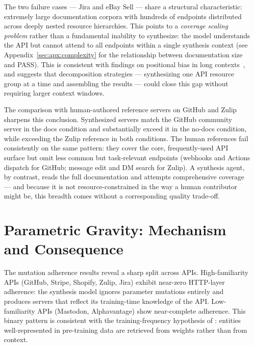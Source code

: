 The two failure cases --- Jira and eBay Sell --- share a structural characteristic: extremely large documentation corpora with hundreds of endpoints distributed across deeply nested resource hierarchies. This points to a \emph{coverage scaling problem} rather than a fundamental inability to synthesize: the model understands the API but cannot attend to all endpoints
within a single synthesis context (see Appendix~\ref{sec:apx:complexity} for the relationship between documentation size and PASS). This is consistent with findings on positional bias in long contexts~\citep{liu2023lostmiddle,disentanglerecall2025},
and suggests that decomposition strategies --- synthesizing one API resource group at a time and assembling the results --- could close this gap without requiring larger context windows.

The comparison with human-authored reference servers on GitHub and Zulip sharpens this conclusion. Synthesized servers match the GitHub community server in the docs condition and substantially exceed it in the no-docs condition, while exceeding the Zulip reference in both conditions. The human references fail consistently on the same pattern: they cover the core, frequently-used API surface but omit less common but task-relevant endpoints (webhooks and Actions dispatch for GitHub; message edit and DM search for Zulip). A synthesis agent, by contrast, reads the full documentation and attempts comprehensive coverage --- and because it is not resource-constrained in the way a human contributor might be, this breadth comes without a corresponding quality trade-off.

\section{Parametric Gravity: Mechanism and Consequence}
\label{sec:discussion-gravity}

The mutation adherence results reveal a sharp split across APIs.
High-familiarity APIs (GitHub, Stripe, Shopify, Zulip, Jira) exhibit near-zero HTTP-layer adherence: the synthesis model ignores parameter mutations entirely and produces servers that reflect its training-time knowledge of the API. Low-familiarity APIs (Mastodon, Alphavantage) show near-complete adherence. This binary pattern is consistent with the training-frequency hypothesis of \citet{mallen2023knowns}: entities well-represented in pre-training data are retrieved from weights rather than from context.

